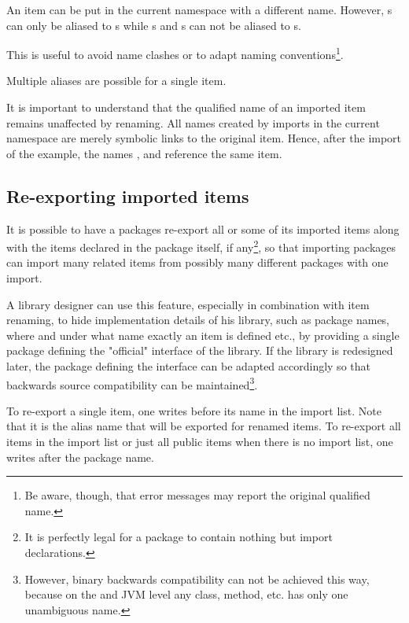 An item can be put in the current namespace with a different name. However, s can only be aliased to s while s and s can not be aliased to s.

This is useful to avoid name clashes or to adapt naming conventions\footnote{
Be aware, though, that error messages may report the original qualified name.}.

Multiple aliases are possible for a single item.


It is important to understand that the qualified name of an imported item remains unaffected by renaming. 
All names created by imports in the current namespace are merely symbolic links to the original item. 
Hence, after the import of the example, the names ,  and  reference the same item. 

\subsection{Re-exporting imported items} \label{reexport}

It is possible to have a packages re-export all or some of its imported items 
along with the items declared in the package itself, if any\footnote{
It is perfectly legal for a package to contain nothing but import declarations.}, 
so that importing  packages can import many related items from possibly many different packages with one import.

A library designer can use this feature, especially in combination with item renaming, 
to hide implementation details of his library, 
such as package names, where and under what name exactly an item is defined etc.,
by providing a single package defining the "official" interface of the library. 
If the library is redesigned later, the package defining the interface can be adapted accordingly 
so that backwards source compatibility can be maintained\footnote{
However, binary backwards compatibility can not be achieved this way, because on the \java{} and JVM level any class,
method, etc. has only one unambiguous name.}.

To re-export a single item, one writes  before its name in the import list. Note that it is the alias name that will be exported for renamed items.
To re-export all items in the import list or just all public items when there is no import list, one writes  after the package name.


